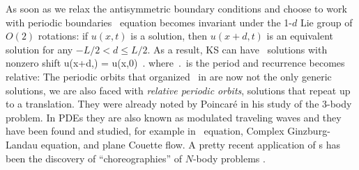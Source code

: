 %
As soon as
we relax the antisymmetric boundary conditions and choose to work with periodic boundaries
\KS\ equation becomes invariant under the 1-$d$ Lie group of $O(2)$ rotations: if
$u(x,t)$ is a solution, then $u(x+d,t)$ is an equivalent
solution for any $-L/2 < d \leq L/2$.
As a result,
KS can have \rpo\ solutions with nonzero shift
\beq
u(x+d,\period{}) = u(x,0)
\,.
where $\period{}$ is the period and recurrence becomes
relative: The periodic orbits that organized \statesp\ in
 are now not the
only generic solutions, we are also faced with {\em relative
periodic orbits}, solutions that repeat up to a
translation.
They were already noted by Poincar\'e in his study of the
3-body problem. In PDEs they are also
known as modulated traveling waves and they have been found and
studied, for example in \KS\ equation, Complex
Ginzburg-Landau equation, and plane Couette
flow. A pretty recent application of \rpo s has
been the discovery of ``choreographies'' of $N$-body problems%
.

